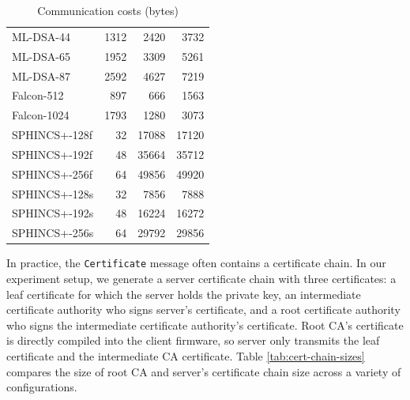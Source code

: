 \documentclass[letterpaper,12pt,titlepage,oneside,final]{book}
\begin{document}
\begin{table}[htbp]
\begin{tabular}[t]{lrrr}
    \midrule
        ML-DSA-44                & 1312  & 2420  & 3732  \\
        ML-DSA-65                & 1952  & 3309  & 5261  \\
        ML-DSA-87                & 2592  & 4627  & 7219  \\
        Falcon-512               & 897   & 666   & 1563  \\
        Falcon-1024              & 1793  & 1280  & 3073  \\
        SPHINCS+-128f            & 32    & 17088 & 17120 \\
        SPHINCS+-192f            & 48    & 35664 & 35712 \\
        SPHINCS+-256f            & 64    & 49856 & 49920 \\
        SPHINCS+-128s            & 32    & 7856  & 7888  \\
        SPHINCS+-192s            & 48    & 16224 & 16272 \\
        SPHINCS+-256s            & 64    & 29792 & 29856 \\
    \bottomrule
    \end{tabular}
    \caption{Communication costs (bytes)}\label{tab:kex-sig-traffic-sizes}
\end{table}

In practice, the \texttt{Certificate} message often contains a certificate chain.
In our experiment setup, we generate a server certificate chain with three certificates: a leaf certificate for which the server holds the private key, an intermediate certificate authority who signs server's certificate, and a root certificate authority who signs the intermediate certificate authority's certificate.
Root CA's certificate is directly compiled into the client firmware, so server only transmits the leaf certificate and the intermediate CA certificate.
Table \ref{tab:cert-chain-sizes} compares the size of root CA and server's certificate chain size across a variety of configurations.
\end{document}

